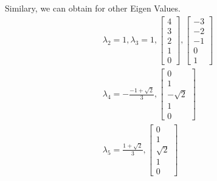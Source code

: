 \documentclass[journal,12pt,twocolumn]{IEEEtran}
\begin{document}
Similary, we can obtain for other Eigen Values.
\begin{align}
\lambda_{2} = 1,\lambda_{3} = 1, \left[\begin{array}{c}4\\3\\2\\1\\0\end{array}\right], \left[\begin{array}{c}-3\\-2\\-1\\0\\1\end{array}\right]
\\
\lambda_{4} = 
- \frac{-1 + \sqrt{2}}{3}, \left[\begin{array}{c}0\\1\\- \sqrt{2}\\1\\0\end{array}\right]
\\
\lambda_{5}= 
\frac{1 + \sqrt{2}}{3},\left[\begin{array}{c}0\\1\\\sqrt{2}\\1\\0\end{array}\right]
\end{align}
\\ 
\\
\end{document}
